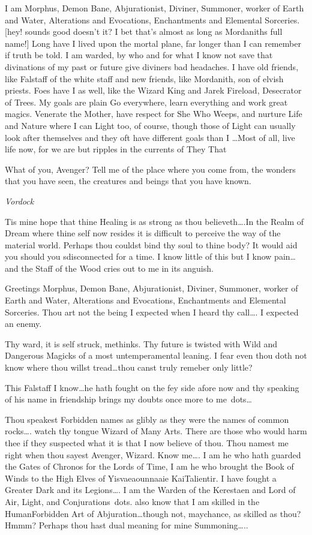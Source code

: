 {I am Morphus, Demon Bane, Abjurationist, Diviner, Summoner, worker of 
Earth and Water, Alterations and Evocations, Enchantments and Elemental 
Sorceries.  [hey! sounds good doesn't it? I bet that's almost as long as 
Mordaniths full name!]  Long have I lived upon the mortal plane, far 
longer than I can remember if truth be told. I am warded, by who and for 
what I know not save that divinations of my past or future give diviners 
bad headaches. I have old friends, like Falstaff of the white staff and 
new friends, like Mordanith, son of elvish priests. Foes have I as well, 
like the Wizard King and Jarek Fireload, Desecrator of Trees. My goals 
are plain \-Go everywhere, learn everything and work great magics. 
Venerate the Mother, have respect for She Who Weeps, and nurture Life 
and Nature where I can \- Light too, of course, though those of Light 
can usually look after themselves and they oft have different goals than 
I \dots  Most of all, live life now, for we are but ripples in the 
currents of They That

What of you, Avenger? Tell me of the place where you come from, the 
wonders that you have seen, the creatures and beings that you have known.

{\em Vordock}

Tis mine hope that thine Healing is as strong as thou 
believeth\dots.In the Realm of Dream where thine self now resides it is 
difficult to perceive the way of the material world.  Perhaps thou 
couldst bind thy soul to thine body? It would aid you should you 
sdisconnected for a time. I know little of this but I know pain\dots and 
the Staff of the Wood cries out to me in its anguish.

Greetings Morphus, Demon Bane, Abjurationist, Diviner, Summoner, worker 
of Earth and Water, Alterations and Evocations, Enchantments and 
Elemental Sorceries. Thou art not the being I expected when I heard thy 
call\dots. I expected an enemy.

Thy ward, it is self struck, methinks. Thy future is twisted with Wild 
and Dangerous Magicks of a most untemperamental leaning. I fear even 
thou doth not know where thou willst tread\dots thou canst truly remeber 
only little?

This Falstaff I know\dots he hath fought on the fey side afore now and 
thy speaking of his name in friendship brings my doubts once more to me\
dots\dots

Thou speakest Forbidden names as glibly as they were the names of common 
rocks\dots. watch thy tongue Wizard of Many Arts. There are those who 
would harm thee if they suspected what it is that I now believe of thou.
Thou namest me right when thou sayest Avenger, Wizard. Know me\dots. I 
am he who hath guarded the Gates of Chronos for the Lords of Time, I am 
he who brought the Book of Winds to the High Elves of Yisvaeaounnaaie 
Kai\-Talientir. I have fought a Greater Dark and its Legions\dots. I am 
the Warden of the Kerestaen and Lord of Air, Light, and Conjurations\
dots. also know that I am skilled in the Human\-Forbidden Art of 
Abjuration\dots though not, maychance, as skilled as thou? Hmmm?
Perhaps thou hast dual meaning for mine Summoning\dots..

}
